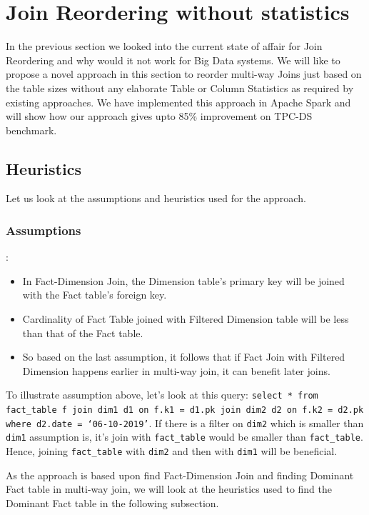 \section{Join Reordering without statistics}\label{sec:jo}
In the previous section we looked into the current state of affair for Join Reordering and why would it not work for Big Data systems. We will like to propose a novel approach in this section to reorder multi-way Joins just based on the table sizes without any elaborate Table or Column Statistics as required by existing approaches.
We have implemented this approach in Apache Spark and will show how our approach gives upto 85\% improvement on TPC-DS benchmark.

\subsection{Heuristics}

Let us look at the assumptions and heuristics used for the approach.

\subsubsection{Assumptions}\label{subsubsec:assumption}:

\begin{itemize}
\item In Fact-Dimension Join, the Dimension table’s primary key will be joined with the Fact table’s foreign key.
\item Cardinality of Fact Table joined with Filtered Dimension table will be less than that of the Fact table.
\item So based on the last assumption, it follows that if Fact Join with Filtered Dimension happens earlier in multi-way join, it can benefit later joins.
\end{itemize}

To illustrate assumption above, let's look at this query:
\texttt{select * from fact\_table f join dim1 d1 on f.k1 = d1.pk join dim2 d2 on f.k2 = d2.pk where d2.date = ‘06-10-2019’}. If there is a filter on \texttt{dim2} which is smaller than \texttt{dim1} assumption is, it’s join with \texttt{fact\_table} would be smaller than \texttt{fact\_table}. Hence, joining \texttt{fact\_table} with \texttt{dim2} and then with \texttt{dim1} will be beneficial.

As the approach is based upon find Fact-Dimension Join and finding Dominant Fact table in multi-way join, we will look at the heuristics used to find the Dominant Fact table in the following subsection.

